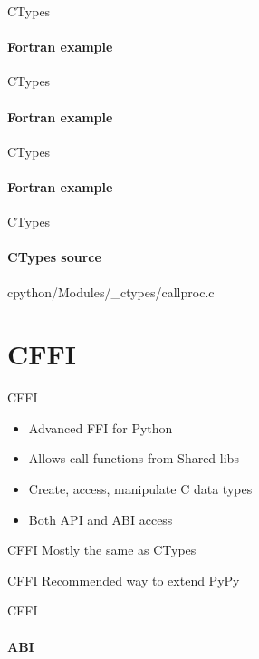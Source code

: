 \documentclass{beamer}
\begin{document}
\begin{frame}{CTypes}
  \framesubtitle{Fortran example}
  \begin{block}{}
  \lstforcmd
  \end{block}
\end{frame}


\begin{frame}{CTypes}
  \framesubtitle{Fortran example}
  \begin{block}{}
  \lstforsym
  \end{block}
\end{frame}

\begin{frame}{CTypes}
  \framesubtitle{Fortran example}
  \begin{block}{}
  \lstforpy
  \end{block}
\end{frame}

\begin{frame}{CTypes}
  \framesubtitle{CTypes source}
  \begin{block}{cpython/Modules/\_ctypes/callproc.c}
  \lstctypesdl
  \end{block}
\end{frame}

\section{CFFI}

\begin{frame}{CFFI}
  \begin{itemize}
  \item Advanced FFI for Python
  \item Allows call functions from Shared libs
  \item Create, access, manipulate C data types
  \item Both API and ABI access
  \end{itemize}
\end{frame}

\begin{frame}{CFFI}
  Mostly the same as CTypes
\end{frame}

\begin{frame}{CFFI}
  Recommended way to extend PyPy
\end{frame}

\begin{frame}{CFFI}
  \framesubtitle{ABI}
  \begin{block}{}
    \lstcffione
  \end{block}
\end{frame}
\end{document}

